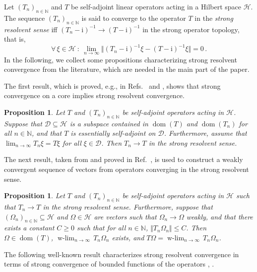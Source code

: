 \documentclass[a4paper, twoside, 11pt, reqno]{amsart}
\theoremstyle{definition}
\theoremstyle{plain}
\newtheorem{proposition}[definition]{Proposition}
\renewcommand{\subset}{\subseteq}
\renewcommand{\Omega}{\varOmega}
\newcommand{\N}{\mathbb{N}}
\newcommand{\MD}{\mathcal{D}}
\newcommand{\MH}{\mathcal{H}}
\newcommand{\ii}{\mathrm{i}}
\newcommand{\1}{\mathbf{1}}
\newcommand{\dlim}[2]{\operatorname*{\text{$#1$}-lim}_{#2}\,}
\DeclareMathOperator{\dom}{dom}
\newcommand{\norm}[2][]{#1\Vert{#2}#1\Vert}
\begin{document}
Let $(T_n)_{n \in \N}$ and $T$ be self-adjoint linear operators acting in a Hilbert space $\MH$. The sequence $(T_n)_{n \in \N}$ is said to converge to the operator $T$ in the \emph{strong resolvent sense} iff $(T_n - \ii)^{-1} \to (T - \ii)^{-1}$ in the strong operator topology, that is,
\begin{equation*}
    \forall \, \xi \in \MH \ : \ \lim_{n \to \infty} \norm[\big]{(T_n - \ii)^{-1} \xi - (T - \ii)^{-1} \xi} = 0 \, .
\end{equation*}
In the following, we collect some propositions characterizing strong resolvent convergence from the literature, which are needed in the main part of the paper.

The first result, which is proved, e.g., in Refs.~\cite[Prop. 10.1.18]{Oliveira2009} and \cite[Thm. VIII.25]{RS1}, shows that strong convergence on a core implies strong resolvent convergence.

\begin{proposition}\label{pro:coreSOimpliesSR}
    Let $T$ and $(T_n)_{n \in \N}$ be self-adjoint operators acting in $\MH$. Suppose that $\MD \subset \MH$ is a subspace contained in $\dom(T)$ and $\dom(T_n)$ for all $n \in \N$, and that $T$ is essentially self-adjoint on $\MD$. Furthermore, assume that $\lim_{n \to \infty} T_n \xi = T \xi$ for all $\xi \in \MD$. Then $T_n \to T$ in the strong resolvent sense.
\end{proposition}

The next result, taken from and proved in Ref.~\cite[Prop. A.4]{DJP03}, is used to construct a weakly convergent sequence of vectors from operators converging in the strong resolvent sense.

\begin{proposition}\label{pro:SRimpliesW}
    Let $T$ and $(T_n)_{n \in \N}$ be self-adjoint operators acting in $\MH$ such that $T_n \to T$ in the strong resolvent sense. Furthermore, suppose that $(\Omega_n)_{n \in \N} \subset \MH$ and $\Omega \in \MH$ are vectors such that $\Omega_n \to \Omega$ weakly, and that there exists a constant $C \ge 0$ such that for all $n \in \N$, $\norm{T_n \Omega_n} \le C$. Then $\Omega \in \dom(T)$, $\dlim{w}{n \to \infty} T_n \Omega_n$ exists, and $T \Omega = \dlim{w}{n \to \infty} T_n \Omega_n$.
\end{proposition}

The following well-known result characterizes strong resolvent convergence in terms of strong convergence of bounded functions of the operators \cite[Prop. 10.1.9]{Oliveira2009}, \cite[Thm. VIII.20]{RS1}.
\end{document}
